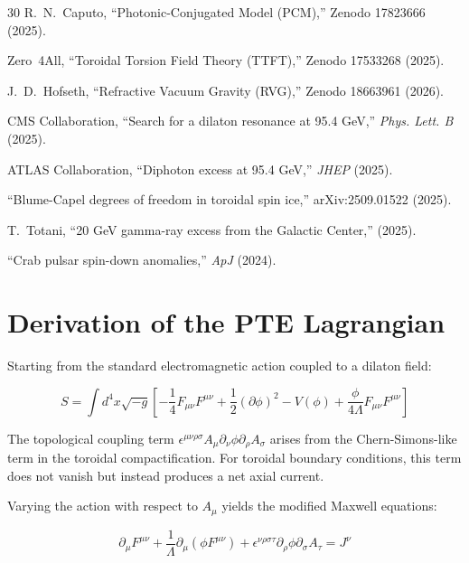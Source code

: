 \documentclass[12pt,a4paper]{article}
\begin{document}
\begin{thebibliography}{30}
R.~N.~Caputo, ``Photonic-Conjugated Model (PCM),'' Zenodo 17823666 (2025).

Zero~4All, ``Toroidal Torsion Field Theory (TTFT),'' Zenodo 17533268 (2025).

J.~D.~Hofseth, ``Refractive Vacuum Gravity (RVG),'' Zenodo 18663961 (2026).

CMS Collaboration, ``Search for a dilaton resonance at 95.4 GeV,'' \textit{Phys. Lett. B} (2025).

ATLAS Collaboration, ``Diphoton excess at 95.4 GeV,'' \textit{JHEP} (2025).

``Blume-Capel degrees of freedom in toroidal spin ice,'' arXiv:2509.01522 (2025).

T.~Totani, ``20 GeV gamma-ray excess from the Galactic Center,'' (2025).

``Crab pulsar spin-down anomalies,'' \textit{ApJ} (2024).

\end{thebibliography}

\appendix

\section{Derivation of the PTE Lagrangian}

Starting from the standard electromagnetic action coupled to a dilaton field:

\begin{equation}
S = \int d^4x \sqrt{-g} \left[ -\frac{1}{4}F_{\mu\nu}F^{\mu\nu} + \frac{1}{2}(\partial\phi)^2 - V(\phi) + \frac{\phi}{4\Lambda}F_{\mu\nu}F^{\mu\nu} \right]
\label{eq:A1}
\end{equation}

The topological coupling term $\epsilon^{\mu\nu\rho\sigma}A_\mu\partial_\nu\phi\partial_\rho A_\sigma$ arises from the Chern-Simons-like term in the toroidal compactification. For toroidal boundary conditions, this term does not vanish but instead produces a net axial current.

Varying the action with respect to $A_\mu$ yields the modified Maxwell equations:

\begin{equation}
\partial_\mu F^{\mu\nu} + \frac{1}{\Lambda}\partial_\mu(\phi F^{\mu\nu}) + \epsilon^{\nu\rho\sigma\tau}\partial_\rho\phi\partial_\sigma A_\tau = J^\nu
\label{eq:A2}
\end{equation}
\end{document}
